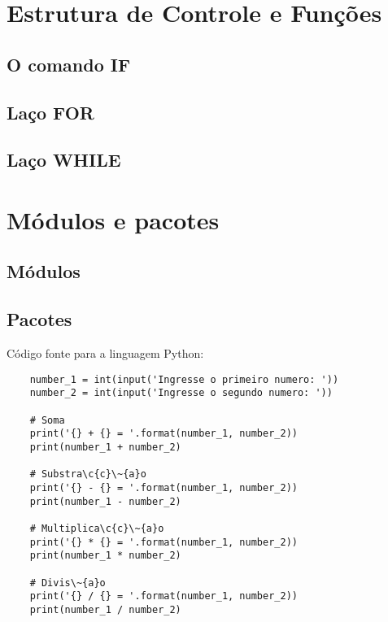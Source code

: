     \section{Estrutura de Controle e Fun\c{c}\~{o}es}

            \subsection{O comando IF}


            \subsection{La\c{c}o FOR}

            \subsection{La\c{c}o WHILE}


    \section{M\'{o}dulos e pacotes}



            \subsection{M\'{o}dulos}



            \subsection{Pacotes}






    C\'{o}digo fonte para a linguagem Python:
    \begin{lstlisting}
    number_1 = int(input('Ingresse o primeiro numero: '))
    number_2 = int(input('Ingresse o segundo numero: '))

    # Soma
    print('{} + {} = '.format(number_1, number_2))
    print(number_1 + number_2)

    # Substra\c{c}\~{a}o
    print('{} - {} = '.format(number_1, number_2))
    print(number_1 - number_2)

    # Multiplica\c{c}\~{a}o
    print('{} * {} = '.format(number_1, number_2))
    print(number_1 * number_2)

    # Divis\~{a}o
    print('{} / {} = '.format(number_1, number_2))
    print(number_1 / number_2)
    \end{lstlisting}





